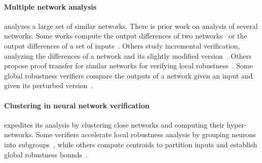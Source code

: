 \paragraph{Multiple network analysis} 
\tool analyzes a large set of similar networks. 
There is prior work on analysis of several networks. 
Some works compute the output differences of two networks~\cite{ref_1,ref_2}
or the output differences of a set of inputs~\cite{ref_102}. 
Others study incremental verification, analyzing the differences of a network and its slightly modified version~\cite{ref_3}. 
Others propose proof transfer for similar networks for verifying local robustness~\cite{ref_4}. 
Some global robustness verifiers compare the outputs of a network given an input and given its perturbed version~\cite{ref_6,ref_7,ref_5}. 
\begin{comment}
\paragraph{Clustering in neural network verification} 
\tool expedites its analysis by clustering close networks and computing their hyper-networks. Several neural network verifiers employ clustering. Some verifiers accelerate local robustness analysis by grouping neurons into subgroups~\cite{ref_9, ref_10}. A different work divides a dataset's inputs into subgroups, computes a centroid point for each, and computes a global robustness bound for each centroid point~\cite{ref_11}.
\end{comment}


\paragraph{Clustering in neural network verification} 
\tool expedites its analysis by clustering close networks and computing their hyper-networks. %
Some verifiers accelerate local robustness analysis by grouping neurons into subgroups~\cite{ref_9, ref_10}, while others compute centroids to partition inputs and establish global robustness bounds~\cite{ref_11}.